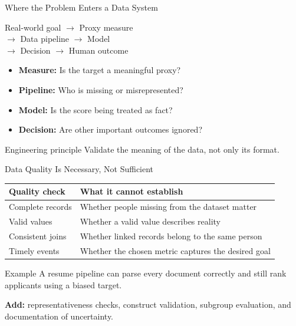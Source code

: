 \documentclass[aspectratio=43,10pt]{beamer}
\begin{document}
\begin{frame}{Where the Problem Enters a Data System}
\begin{center}
\large Real-world goal $\longrightarrow$ Proxy measure\\[0.3cm]
$\longrightarrow$ Data pipeline $\longrightarrow$ Model\\[0.3cm]
$\longrightarrow$ Decision $\longrightarrow$ Human outcome
\end{center}
\vspace{0.2cm}
\begin{itemize}
  \item \textbf{Measure:} Is the target a meaningful proxy?
  \item \textbf{Pipeline:} Who is missing or misrepresented?
  \item \textbf{Model:} Is the score being treated as fact?
  \item \textbf{Decision:} Are other important outcomes ignored?
\end{itemize}
\begin{block}{Engineering principle}
Validate the meaning of the data, not only its format.
\end{block}
\end{frame}

\begin{frame}{Data Quality Is Necessary, Not Sufficient}
\small
\begin{tabular}{p{2.45cm}p{7.0cm}}
\toprule
\textbf{Quality check} & \textbf{What it cannot establish}\\
\midrule
Complete records & Whether people missing from the dataset matter\\
Valid values & Whether a valid value describes reality\\
Consistent joins & Whether linked records belong to the same person\\
Timely events & Whether the chosen metric captures the desired goal\\
\bottomrule
\end{tabular}

\medskip
\begin{block}{Example}
A resume pipeline can parse every document correctly
and still rank applicants using a biased target.
\end{block}
\textbf{Add:} representativeness checks, construct validation,
subgroup evaluation, and documentation of uncertainty.
\end{frame}
\end{document}
